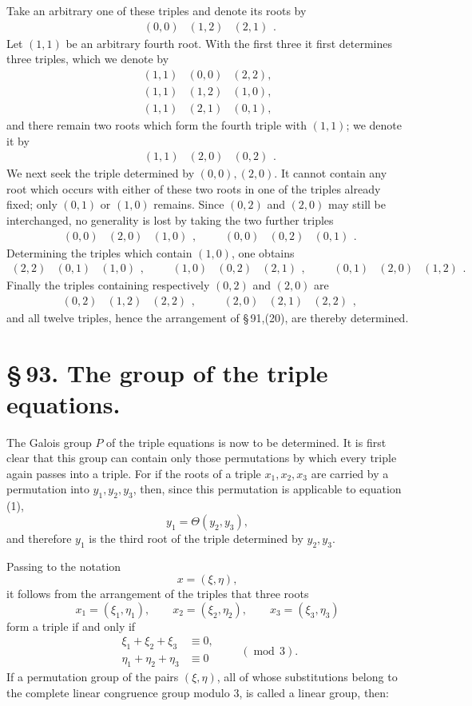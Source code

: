 \documentclass[11pt]{article}
\providecommand{\trip}[3]{\begin{array}{ccc}#1&#2&#3\end{array}}
\providecommand{\trip}[3]{\begin{array}{ccc}#1&#2&#3\end{array}}
\begin{document}
Take an arbitrary one of these triples and denote its roots by
\[
\trip{(0,0)}{(1,2)}{(2,1)}.
\]
Let \((1,1)\) be an arbitrary fourth root. With the first three it first determines three triples, which we denote by
\[
\begin{array}{ccc}
(1,1)&(0,0)&(2,2),\\
(1,1)&(1,2)&(1,0),\\
(1,1)&(2,1)&(0,1),
\end{array}
\]
and there remain two roots which form the fourth triple with \((1,1)\); we denote it by
\[
\trip{(1,1)}{(2,0)}{(0,2)}.
\]
We next seek the triple determined by \((0,0),(2,0)\). It cannot contain any root which occurs with either of these two roots in one of the triples already fixed; only \((0,1)\) or \((1,0)\) remains. Since \((0,2)\) and \((2,0)\) may still be interchanged, no generality is lost by taking the two further triples
\[
\trip{(0,0)}{(2,0)}{(1,0)},
\qquad
\trip{(0,0)}{(0,2)}{(0,1)}.
\]
Determining the triples which contain \((1,0)\), one obtains
\[
\trip{(2,2)}{(0,1)}{(1,0)},
\qquad
\trip{(1,0)}{(0,2)}{(2,1)},
\qquad
\trip{(0,1)}{(2,0)}{(1,2)}.
\]
Finally the triples containing respectively \((0,2)\) and \((2,0)\) are
\[
\trip{(0,2)}{(1,2)}{(2,2)},
\qquad
\trip{(2,0)}{(2,1)}{(2,2)},
\]
and all twelve triples, hence the arrangement of \S\,91,(20), are thereby determined.

\section*{\S\,93. The group of the triple equations.}

The Galois group \(P\) of the triple equations is now to be determined. It is first clear that this group can contain only those permutations by which every triple again passes into a triple. For if the roots of a triple \(x_1,x_2,x_3\) are carried by a permutation into \(y_1,y_2,y_3\), then, since this permutation is applicable to equation (1),
\[
 y_1=\Theta(y_2,y_3),
\]
and therefore \(y_1\) is the third root of the triple determined by \(y_2,y_3\).

Passing to the notation
\begin{equation}
 x=(\xi,\eta),
 \tag{1}
\end{equation}
it follows from the arrangement of the triples that three roots
\begin{equation}
 x_1=(\xi_1,\eta_1),\qquad x_2=(\xi_2,\eta_2),\qquad x_3=(\xi_3,\eta_3)
 \tag{2}
\end{equation}
form a triple if and only if
\begin{equation}
\begin{aligned}
 \xi_1+\xi_2+\xi_3&\equiv 0,\\
 \eta_1+\eta_2+\eta_3&\equiv 0
\end{aligned}
\qquad (\operatorname{mod}\,3).
\tag{3}
\end{equation}
If a permutation group of the pairs \((\xi,\eta)\), all of whose substitutions belong to the complete linear congruence group modulo 3, is called a linear group, then:
\end{document}
